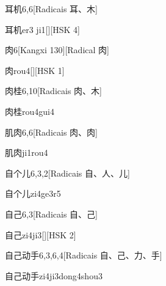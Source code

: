 \begin{entry}{耳机}{6,6}[Radicais ⽿、⽊]
  \begin{phonetics}{耳机}{er3 ji1}[][HSK 4]
  \end{phonetics}
\end{entry}

\begin{entry}{肉}{6}[Kangxi 130][Radical ⾁]
  \begin{phonetics}{肉}{rou4}[][HSK 1]
  \end{phonetics}
\end{entry}

\begin{entry}{肉桂}{6,10}[Radicais ⾁、⽊]
  \begin{phonetics}{肉桂}{rou4gui4}
  \end{phonetics}
\end{entry}

\begin{entry}{肌肉}{6,6}[Radicais ⾁、⾁]
  \begin{phonetics}{肌肉}{ji1rou4}
  \end{phonetics}
\end{entry}

\begin{entry}{自个儿}{6,3,2}[Radicais ⾃、⼈、⼉]
  \begin{phonetics}{自个儿}{zi4ge3r5}
  \end{phonetics}
\end{entry}

\begin{entry}{自己}{6,3}[Radicais ⾃、⼰]
  \begin{phonetics}{自己}{zi4ji3}[][HSK 2]
  \end{phonetics}
\end{entry}

\begin{entry}{自己动手}{6,3,6,4}[Radicais ⾃、⼰、⼒、⼿]
  \begin{phonetics}{自己动手}{zi4ji3dong4shou3}
  \end{phonetics}
\end{entry}

